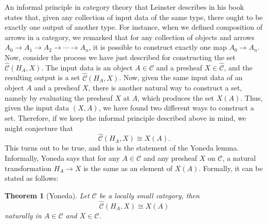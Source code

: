 \documentclass[10pt,oneside]{book}
\def\~#1{\mathscr{#1}}
\def\pre#1{\widehat{#1}}
\theoremstyle{plain}
\newtheorem{thm}{Theorem}[section]
\theoremstyle{definition}
\theoremstyle{remark}
\numberwithin{equation}{section}
\numberwithin{figure}{section}
\begin{document}
An informal principle in category theory that Leinster describes in his book \cite{leinster2016} states that, given any collection of input data of the same type, there ought to be exactly one output of another type. For instance, when we defined composition of arrows in a category, we remarked that for any collection of objects and arrows $A_0 \to A_1 \to A_2 \to \cdots \to A_n$, it is possible to construct exactly one map $A_0 \to A_n$. Now, consider the process we have just described for constructing the set $\pre{\~C}(H_A, X)$. The input data is an object $A \in \~C$ and a presheaf $X \in \pre{\~C}$, and the resulting output is a set $\pre{\~C}(H_A, X)$. Now, given the same input data of an object $A$ and a presheaf $X$, there is another natural way to construct a set, namely by evaluating the presheaf $X$ at $A$, which produces the set $X(A)$. Thus, given the input data $(X, A)$, we have found two different ways to construct a set. Therefore, if we keep the informal principle described above in mind, we might conjecture that
\[\pre{\~C}(H_A, X) \cong X(A).\]
This turns out to be true, and this is the statement of the Yoneda lemma. Informally, Yoneda says that for any $A \in \~C$ and any presheaf $X$ on $\~C$, a natural transformation $H_A \to X$ is the same as an element of $X(A)$. Formally, it can be stated as follows:
\begin{thm}[Yoneda]
\label{thm:yoneda}
    Let $\~C$ be a locally small category, then 
    \[\pre{\~C}(H_A, X) \cong X(A)\]
    naturally in $A \in \~C$ and $X \in \pre{\~C}$.
\end{thm}
\end{document}
